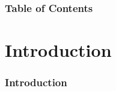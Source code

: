 \documentclass[hyperref={pdfpagelabels=true}]{beamer}
\begin{document}
\begin{frame}
\frametitle{Table of Contents}
\tableofcontents%
\end{frame}

\section{Introduction} 
\begin{frame}
\frametitle{Introduction}
\begin{columns}
  \begin{column}{0.7\textwidth}\small{ 

}
\end{column}
\end{columns}
\end{frame}
\end{document}
